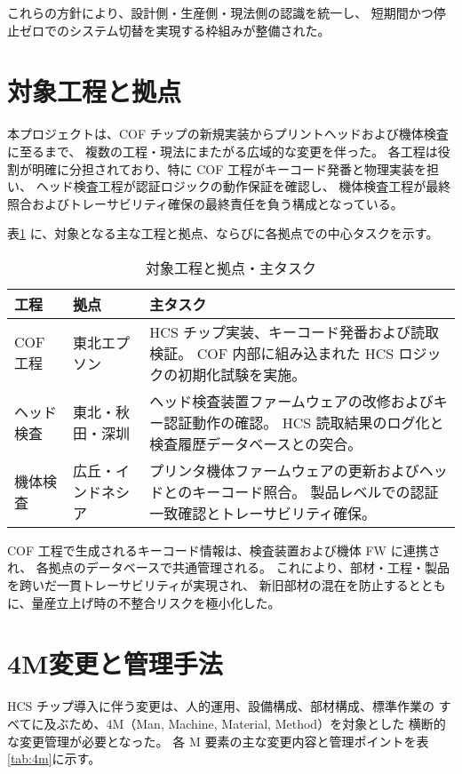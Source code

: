 \documentclass[journal,twocolumn]{IEEEtran}
\begin{document}
これらの方針により、設計側・生産側・現法側の認識を統一し、
短期間かつ停止ゼロでのシステム切替を実現する枠組みが整備された。

\section{対象工程と拠点}

本プロジェクトは、COF チップの新規実装からプリントヘッドおよび機体検査に至るまで、
複数の工程・現法にまたがる広域的な変更を伴った。
各工程は役割が明確に分担されており、特に COF 工程がキーコード発番と物理実装を担い、
ヘッド検査工程が認証ロジックの動作保証を確認し、
機体検査工程が最終照合およびトレーサビリティ確保の最終責任を負う構成となっている。

表\ref{tab:sitemap} に、対象となる主な工程と拠点、ならびに各拠点での中心タスクを示す。

\begin{table}[t]
\caption{対象工程と拠点・主タスク}
\label{tab:sitemap}
\centering
\begin{tabularx}{\columnwidth}{@{}l l X@{}}
\toprule
工程 & 拠点 & 主タスク \\
\midrule
COF工程 & 東北エプソン &
HCS チップ実装、キーコード発番および読取検証。
COF 内部に組み込まれた HCS ロジックの初期化試験を実施。 \\[2pt]
ヘッド検査 & 東北・秋田・深圳 &
ヘッド検査装置ファームウェアの改修およびキー認証動作の確認。
HCS 読取結果のログ化と検査履歴データベースとの突合。 \\[2pt]
機体検査 & 広丘・インドネシア &
プリンタ機体ファームウェアの更新およびヘッドとのキーコード照合。
製品レベルでの認証一致確認とトレーサビリティ確保。 \\
\bottomrule
\end{tabularx}
\end{table}

COF 工程で生成されるキーコード情報は、検査装置および機体 FW に連携され、
各拠点のデータベースで共通管理される。
これにより、部材・工程・製品を跨いだ一貫トレーサビリティが実現され、
新旧部材の混在を防止するとともに、量産立上げ時の不整合リスクを極小化した。

\section{4M変更と管理手法}

HCS チップ導入に伴う変更は、人的運用、設備構成、部材構成、標準作業の
すべてに及ぶため、4M（Man, Machine, Material, Method）を対象とした
横断的な変更管理が必要となった。
各 M 要素の主な変更内容と管理ポイントを表\ref{tab:4m}に示す。
\end{document}
